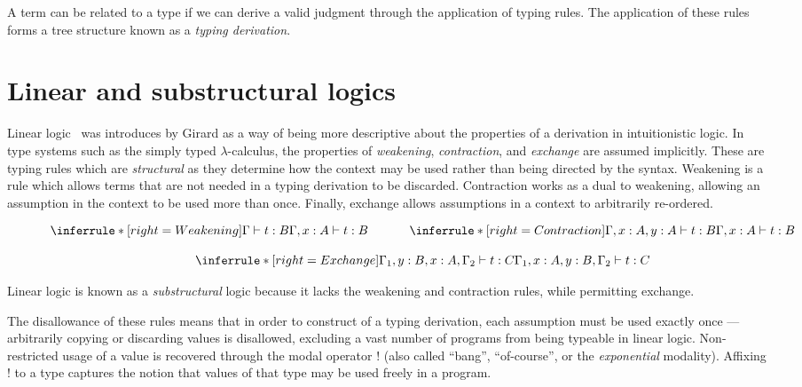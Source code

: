 A term can be related to a type if we can derive a valid judgment through the
application of typing rules. The application of these rules forms a tree
structure known as a \textit{typing derivation}.


\section{Linear and substructural logics}
Linear logic~\cite{} was introduces by Girard as a way of being more descriptive
about the properties of a derivation in intuitionistic logic. In type systems
such as the simply typed $\lambda$-calculus, the properties of \textit{weakening},
\textit{contraction}, and \textit{exchange} are assumed implicitly. These are
typing rules which are \textit{structural} as they determine how the context
may be used rather than being directed by the syntax. Weakening is a rule which allows terms
that are not needed in a typing derivation to be discarded. Contraction works as a dual to weakening, allowing an
assumption in the context to be used more than once. Finally, exchange allows assumptions in a context to arbitrarily re-ordered.


\begin{figure}[H]
  \begin{align*}
  \begin{array}{c}
    \inferrule*[right=Weakening]{\Gamma \vdash t : B}{\Gamma, x : A \vdash t : B}
    \;\;\;\;
    \;\;\;\;
    \;\;\;\;
    \inferrule*[right=Contraction]{\Gamma, x : A, y : A \vdash t : B}{\Gamma, x : A \vdash t : B}
    \\\\
    \inferrule*[right=Exchange]{\Gamma_{1}, y : B, x : A, \Gamma_{2} \vdash t : C} {\Gamma_{1}, x : A, y : B, \Gamma_{2} \vdash t : C}
    \end{array}
  \end{align*}
\end{figure}

Linear logic is known as a \textit{substructural} logic because it lacks the weakening
and contraction rules, while permitting exchange.

The disallowance of these rules means that in order to construct of a typing
derivation, each assumption must be used exactly once --- arbitrarily copying or
discarding values is disallowed, excluding a vast number of programs from being
typeable in linear logic. Non-restricted usage of a value is recovered through
the modal operator $!$ (also called ``bang'', ``of-course'', or the
\textit{exponential} modality). Affixing $!$ to a type captures the notion that values of
that type may be used freely in a program.

